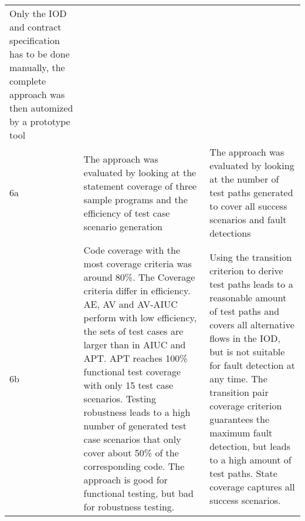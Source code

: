 \begin{longtable}[h]{p{0.5cm}p{}p{}}
	Only the IOD and contract specification has to be done manually, the complete approach was then automized by a prototype tool \\
	6a & 
	The approach was evaluated by looking at the statement coverage of three sample programs and the efficiency of test case scenario generation & 
	The approach was evaluated by looking at the number of test paths generated to cover all success scenarios and fault detections \\
	6b &
	Code coverage with the most coverage criteria was around 80\%. The Coverage criteria differ in efficiency. AE, AV and AV-AIUC perform with low efficiency, the sets of test cases are larger than in AIUC and APT. APT reaches 100\% functional test coverage with only 15 test case scenarios. Testing robustness leads to a high number of generated test case scenarios that only cover about 50\% of the corresponding code. The approach is good for functional testing, but bad for robustness testing. &
	Using the transition criterion to derive test paths leads to a reasonable amount of test paths and covers all alternative flows in the IOD, but is not suitable for fault detection at any time. The transition pair coverage criterion guarantees the maximum fault detection, but leads to a high amount of test paths. State coverage captures all success scenarios. \\
\end{longtable}
